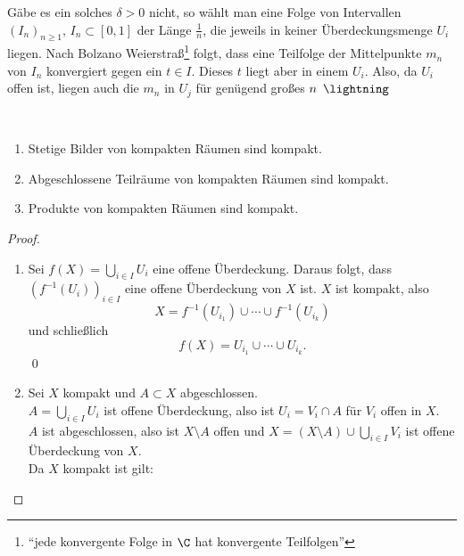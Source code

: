 \begin{remark}
  Gäbe es ein solches \( \delta > 0 \) nicht, so wählt man eine Folge von Intervallen \( {(I_n)}_{n \geq 1} \), \( I_n \subset [0,1] \) der Länge \( \tfrac{1}{n} \), die jeweils in keiner Überdeckungsmenge \( U_i \) liegen. Nach Bolzano Weierstraß\footnote{``jede konvergente Folge in \( \C \) hat konvergente Teilfolgen''} folgt, dass eine Teilfolge der Mittelpunkte \( m_n \) von \( I_n \) konvergiert gegen ein \( t \in I \). Dieses \( t \) liegt aber in einem \( U_i \). Also, da \( U_i \) offen ist, liegen auch die \( m_n \) in \( U_j \) für genügend großes \( n \enskip \lightning \)
\end{remark}

\begin{theorem}
  \
  \begin{enumerate}
    \item Stetige Bilder von kompakten Räumen sind kompakt.
    \item Abgeschlossene Teilräume von kompakten Räumen sind kompakt.
    \item Produkte von kompakten Räumen sind kompakt. 
  \end{enumerate}
  \begin{proof}
    \
    \begin{enumerate}
      \item Sei \( f(X) = \bigcup_{i \in I} U_i \) eine offene Überdeckung. Daraus folgt, dass \( {\left( f^{-1}(U_i) \right)}_{i \in I} \) eine offene Überdeckung von \( X \) ist. \( X \) ist kompakt, also
      \begin{equation*}
        X = f^{-1}(U_{i_1}) \cup \cdots \cup f^{-1}(U_{i_k})
      \end{equation*}
      und schließlich
      \begin{equation*}
        f(X) = U_{i_1} \cup \cdots \cup U_{i_k}\text{.}
      \end{equation*}
      \qed{}
      \item Sei \( X \) kompakt und \( A \subset X \) abgeschlossen. \\
        \( A = \bigcup_{i \in I} U_i \) ist offene Überdeckung, also ist \( U_i = V_i \cap A \) für \( V_i \) offen in \( X \). \\
        \( A \) ist abgeschlossen, also ist \( X \setminus A \) offen und \( X = (X \setminus A) \cup \bigcup_{i \in I} V_i \) ist offene Überdeckung von \( X \). \\
        Da \( X \) kompakt ist gilt:

\end{enumerate}
\end{proof}
\end{theorem}
